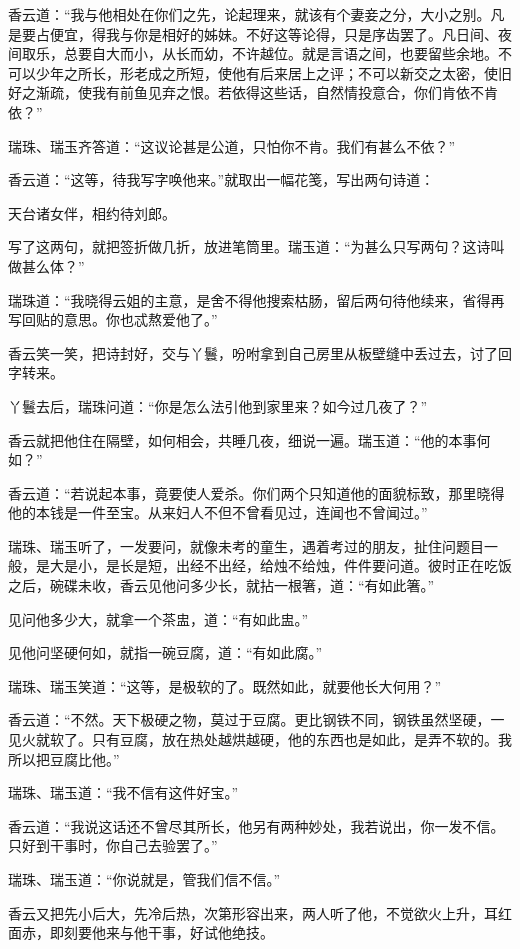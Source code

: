 \documentclass[a4paper,12pt,UTF8,twoside]{ctexbook}
\begin{document}
香云道：“我与他相处在你们之先，论起理来，就该有个妻妾之分，大小之别。凡是要占便宜，得我与你是相好的姊妹。不好这等论得，只是序齿罢了。凡日间、夜间取乐，总要自大而小，从长而幼，不许越位。就是言语之间，也要留些余地。不可以少年之所长，形老成之所短，使他有后来居上之评；不可以新交之太密，使旧好之渐疏，使我有前鱼见弃之恨。若依得这些话，自然情投意合，你们肯依不肯依？”

瑞珠、瑞玉齐答道：“这议论甚是公道，只怕你不肯。我们有甚么不依？”

香云道：“这等，待我写字唤他来。”就取出一幅花笺，写出两句诗道：

天台诸女伴，相约待刘郎。

写了这两句，就把签折做几折，放进笔筒里。瑞玉道：“为甚么只写两句？这诗叫做甚么体？”

瑞珠道：“我晓得云姐的主意，是舍不得他搜索枯肠，留后两句待他续来，省得再写回贴的意思。你也忒熬爱他了。”

香云笑一笑，把诗封好，交与丫鬟，吩咐拿到自己房里从板壁缝中丢过去，讨了回字转来。

丫鬟去后，瑞珠问道：“你是怎么法引他到家里来？如今过几夜了？”

香云就把他住在隔壁，如何相会，共睡几夜，细说一遍。瑞玉道：“他的本事何如？”

香云道：“若说起本事，竟要使人爱杀。你们两个只知道他的面貌标致，那里晓得他的本钱是一件至宝。从来妇人不但不曾看见过，连闻也不曾闻过。”

瑞珠、瑞玉听了，一发要问，就像未考的童生，遇着考过的朋友，扯住问题目一般，是大是小，是长是短，出经不出经，给烛不给烛，件件要问道。彼时正在吃饭之后，碗碟未收，香云见他问多少长，就拈一根箸，道：“有如此箸。”

见问他多少大，就拿一个茶盅，道：“有如此盅。”

见他问坚硬何如，就指一碗豆腐，道：“有如此腐。”

瑞珠、瑞玉笑道：“这等，是极软的了。既然如此，就要他长大何用？”

香云道：“不然。天下极硬之物，莫过于豆腐。更比钢铁不同，钢铁虽然坚硬，一见火就软了。只有豆腐，放在热处越烘越硬，他的东西也是如此，是弄不软的。我所以把豆腐比他。”

瑞珠、瑞玉道：“我不信有这件好宝。”

香云道：“我说这话还不曾尽其所长，他另有两种妙处，我若说出，你一发不信。只好到干事时，你自己去验罢了。”

瑞珠、瑞玉道：“你说就是，管我们信不信。”

香云又把先小后大，先冷后热，次第形容出来，两人听了他，不觉欲火上升，耳红面赤，即刻要他来与他干事，好试他绝技。
\end{document}
